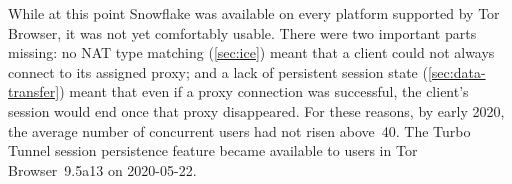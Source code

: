 \documentclass[letterpaper,twocolumn]{article}
\begin{document}
While at this point Snowflake was available
on every platform supported by Tor Browser,
it was not yet comfortably usable.
There were two important parts missing:
no NAT type matching (\autoref{sec:ice})
meant that a client could not always connect to its assigned proxy;
and a lack of persistent session state (\autoref{sec:data-transfer})
meant that even if a proxy connection was successful,
the client's session would end once that proxy disappeared.
For these reasons, by early 2020,
the average number of concurrent users
had not risen above~40.
%
%
The Turbo Tunnel session persistence feature
became available to users in Tor Browser~9.5a13
on \mbox{2020-05-22}.
\end{document}
